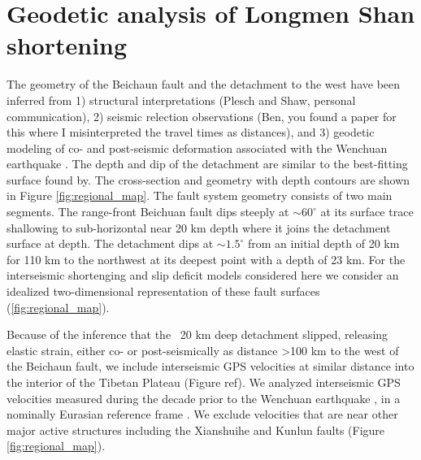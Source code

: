 \documentclass[12pt]{article}
\begin{document}
\section{Geodetic analysis of Longmen Shan shortening}
The geometry of the Beichaun fault and the detachment to the west have been inferred from 1) structural interpretations  \citet{Hubbard2010} (Plesch and Shaw, personal communication), 2) seismic relection observations (Ben, you found a paper for this where I misinterpreted the travel times as distances), and 3) geodetic modeling of co- and post-seismic deformation associated with the Wenchuan earthquake \citet{Qi2011, Fielding2013b}. The depth and dip of the detachment are similar to the best-fitting surface found by. The cross-section and geometry with depth contours are shown in Figure \ref{fig:regional_map}. The fault system geometry consists of two main segments. The range-front Beichuan fault dips steeply at $\sim 60^{\circ}$ at its surface trace shallowing to sub-horizontal near 20 km depth where it joins the detachment surface at depth. The detachment dips at $\sim 1.5^{\circ}$ from an initial depth of 20 km for 110 km to the northwest at its deepest point with a depth of 23 km. For the interseismic shortenging and slip deficit models considered here we consider an idealized two-dimensional representation of these fault surfaces (\ref{fig:regional_map}).

Because of the inference that the ~20 km deep detachment slipped, releasing elastic strain, either co- or post-seismically \citet{Qi2011} as distance >100 km to the west of the Beichaun fault, we include interseismic GPS velocities at similar distance into the interior of the Tibetan Plateau (Figure ref). We analyzed interseismic GPS velocities measured during the decade prior to the Wenchuan earthquake \citep{gan07}, in a nominally Eurasian reference frame \citet{apel06}. We exclude velocities that are near other major active structures including the Xianshuihe and Kunlun faults (Figure \ref{fig:regional_map}).
\end{document}
